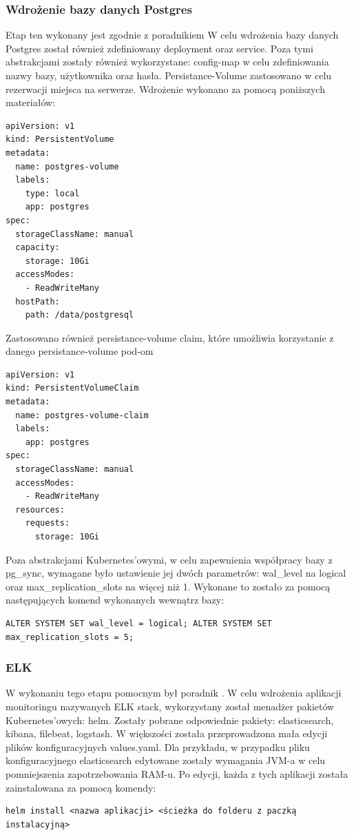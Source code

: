 \subsubsection{Wdrożenie bazy danych Postgres}
Etap ten wykonany jest zgodnie z poradnikiem \cite{DigitalOtionPostgresToK8s}
W celu wdrożenia bazy danych Postgres został również zdefiniowany deployment oraz service. Poza tymi abstrakcjami zostały również wykorzystane: config-map w celu zdefiniowania nazwy bazy, użytkownika oraz hasła. Persistance-Volume zastosowano w celu rezerwacji miejsca na serwerze. Wdrożenie wykonano za pomocą poniższych materiałów:
\begin{verbatim}
apiVersion: v1
kind: PersistentVolume
metadata:
  name: postgres-volume
  labels:
    type: local
    app: postgres
spec:
  storageClassName: manual
  capacity:
    storage: 10Gi
  accessModes:
    - ReadWriteMany
  hostPath:
    path: /data/postgresql
\end{verbatim}
Zastosowano również persistance-volume claim, które umożliwia korzystanie z danego persistance-volume pod-om
\begin{verbatim}
apiVersion: v1
kind: PersistentVolumeClaim
metadata:
  name: postgres-volume-claim
  labels:
    app: postgres
spec:
  storageClassName: manual
  accessModes:
    - ReadWriteMany
  resources:
    requests:
      storage: 10Gi
\end{verbatim}

Poza abstrakcjami Kubernetes'owymi, w celu zapewnienia  współpracy bazy z pg\_sync,  wymagane było ustawienie jej dwóch parametrów: wal\_level na logical oraz max\_replication\_slots na więcej niż 1. Wykonane to zostało za pomocą następujących komend wykonanych wewnątrz bazy:
\begin{verbatim}
ALTER SYSTEM SET wal_level = logical; ALTER SYSTEM SET max_replication_slots = 5;
\end{verbatim}
\subsubsection{ELK}
W wykonaniu tego etapu pomocnym był poradnik \cite{ELKTutorial}.
W celu wdrożenia aplikacji monitoringu nazywanych ELK stack, wykorzystany został menadżer pakietów Kubernetes'owych: helm. Zostały pobrane odpowiednie pakiety: elasticsearch, kibana, filebeat, logstash. W większości została przeprowadzona mała edycji plików konfiguracyjnych values.yaml. Dla przykładu, w przypadku pliku konfiguracyjnego elasticsearch edytowane zostały wymagania JVM-a w celu pomniejszenia zapotrzebowania RAM-u. Po edycji, każda z tych aplikacji została zainstalowana za pomocą komendy:
\begin{verbatim}
helm install <nazwa aplikacji> <ścieżka do folderu z paczką instalacyjną>
\end{verbatim}

